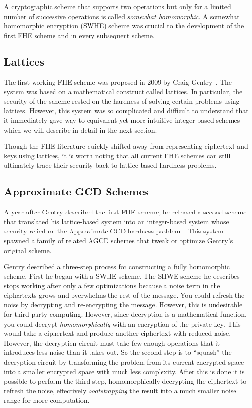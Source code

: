 \documentclass[letterpaper,twocolumn,10pt]{article}
\begin{document}
A cryptographic scheme that supports two operations but only for a limited number of successive operations is called \emph{somewhat homomorphic}. A somewhat homomorphic encryption (SWHE) scheme was crucial to the development of the first FHE scheme and in every subsequent scheme.

\subsection{Lattices}
The first working FHE scheme was proposed in 2009 by Craig Gentry~\cite{GentryThesis09, GentrySTOC09}. The system was based on a mathematical construct called lattices. In particular, the security of the scheme rested on the hardness of solving certain problems using lattices. However, this system was so complicated and difficult to understand that it immediately gave way to equivalent yet more intuitive integer-based schemes~\cite{SmartVercauteren, DGHV} which we will describe in detail in the next section.

Though the FHE literature quickly shifted away from representing ciphertext and keys using lattices, it is worth noting that all current FHE schemes can still ultimately trace their security back to lattice-based hardness problems. 

\subsection{Approximate GCD Schemes}
A year after Gentry described the first FHE scheme, he released a second scheme that translated his lattice-based system into an integer-based system whose security relied on the Approximate GCD hardness problem~\cite{DGHV}. This system spawned a family of related AGCD schemes that tweak or optimize Gentry's original scheme.

Gentry described a three-step process for constructing a fully homomorphic scheme. First he began with a SWHE scheme. The SHWE scheme he describes stops working after only a few optimizations because a noise term in the ciphertexts grows and overwhelms the rest of the message. You could refresh the noise by decrypting and re-encrypting the message. However, this is undesirable for third party computing. However, since decryption is a mathematical function, you could decrypt \emph{homomorphically} with an encryption of the private key. This would take a ciphertext and produce another ciphertext with reduced noise. However, the decryption circuit must take few enough operations that it introduces less noise than it takes out. So the second step is to ``squash'' the decryption circuit by transforming the problem from its current encrypted space into a smaller encrypted space with much less complexity. After this is done it is possible to perform the third step, homomorphically decrypting the ciphertext to refresh the noise, effectively \emph{bootstrapping} the result into a much smaller noise range for more computation.
\end{document}
